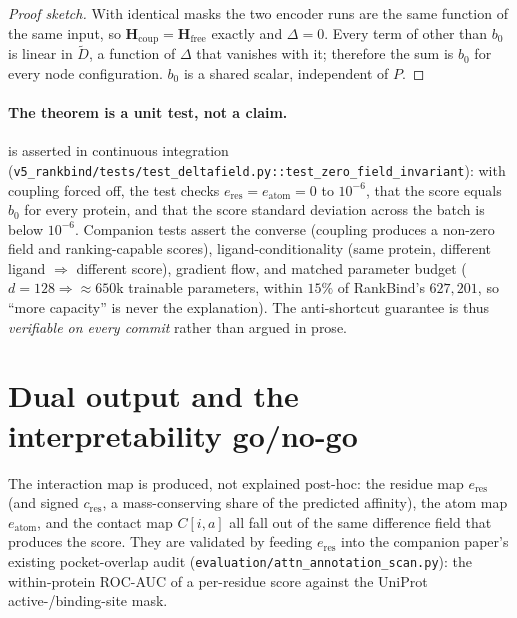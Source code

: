 \documentclass[11pt,a4paper]{article}
\newcommand{\method}{RankBind\xspace}
\newcommand{\Hfree}{\mathbf{H}_{\text{free}}}
\newcommand{\Hcoup}{\mathbf{H}_{\text{coup}}}
\begin{document}
\begin{proof}[Proof sketch]
With identical masks the two encoder runs are the same function of the same
input, so $\Hcoup=\Hfree$ exactly and $\Delta=0$. Every term of
 other than $b_0$ is linear in $\tilde{D}$, a function of
$\Delta$ that vanishes with it; therefore the sum is $b_0$ for every node
configuration. $b_0$ is a shared scalar, independent of $P$.
\end{proof}

\paragraph{The theorem is a unit test, not a claim.}
 is asserted in continuous integration
(\texttt{v5\_rankbind/tests/test\_deltafield.py::test\_zero\_field\_invariant}):
with coupling forced off, the test checks $e_{\text{res}}=e_{\text{atom}}=0$ to
$10^{-6}$, that the score equals $b_0$ for every protein, and that the score
standard deviation across the batch is below $10^{-6}$. Companion tests assert
the converse (coupling produces a non-zero field and ranking-capable scores),
ligand-conditionality (same protein, different ligand $\Rightarrow$ different
score), gradient flow, and matched parameter budget ($d=128\Rightarrow
\approx\!650$k trainable parameters, within $15\%$ of \method's $627{,}201$,
so ``more capacity'' is never the explanation). The anti-shortcut guarantee is
thus \emph{verifiable on every commit} rather than argued in prose.

\section{Dual output and the interpretability go/no-go}
\label{sec:dual}

The interaction map is produced, not explained post-hoc: the residue map
$e_{\text{res}}$ (and signed $c_{\text{res}}$, a mass-conserving share of the
predicted affinity), the atom map $e_{\text{atom}}$, and the contact map
$C[i,a]$ all fall out of the same difference field that produces the score.
They are validated by feeding $e_{\text{res}}$ into the companion paper's
existing pocket-overlap audit
(\texttt{evaluation/attn\_annotation\_scan.py}): the within-protein ROC-AUC of
a per-residue score against the UniProt active-/binding-site mask.
\end{document}
